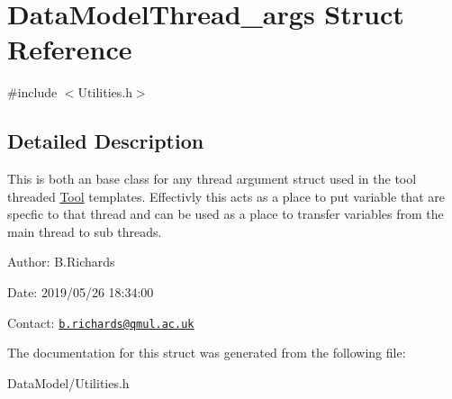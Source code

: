 \hypertarget{structDataModelThread__args}{\section{Data\-Model\-Thread\-\_\-args Struct Reference}
\label{structDataModelThread__args}
}


{\ttfamily \#include $<$Utilities.\-h$>$}



\subsection{Detailed Description}
This is both an base class for any thread argument struct used in the tool threaded \hyperlink{classTool}{Tool} templates. Effectivly this acts as a place to put variable that are specfic to that thread and can be used as a place to transfer variables from the main thread to sub threads.

\begin{DoxyParagraph}{Author\-:}
B.\-Richards 
\end{DoxyParagraph}
\begin{DoxyParagraph}{Date\-:}
2019/05/26 18\-:34\-:00 
\end{DoxyParagraph}
Contact\-: \href{mailto:b.richards@qmul.ac.uk}{\tt b.\-richards@qmul.\-ac.\-uk} 

The documentation for this struct was generated from the following file\-:\begin{DoxyCompactItemize}
\item 
Data\-Model/Utilities.\-h\end{DoxyCompactItemize}
